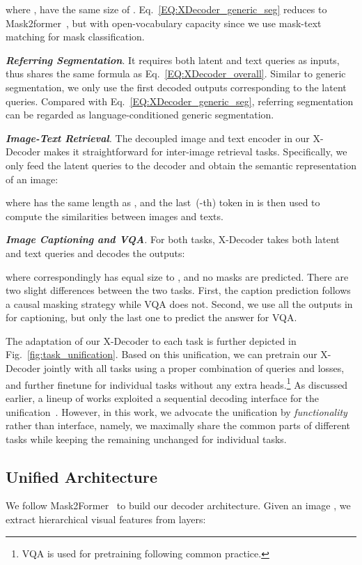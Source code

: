 \documentclass[10pt,twocolumn,letterpaper]{article}
\newcommand{\ourmodel}{X-Decoder}
\begin{document}
    where ,  have the same size of . Eq.~\eqref{EQ:XDecoder_generic_seg} reduces to Mask2former~\cite{cheng2022masked}, but with open-vocabulary capacity since we use mask-text matching for mask classification. 
    
     \textit{\textbf{Referring Segmentation}}. It requires both latent and text queries as inputs, thus shares the same formula as Eq.~\eqref{EQ:XDecoder_overall}. Similar to generic segmentation, we only use the first  decoded outputs corresponding to the latent queries. Compared with Eq.~\eqref{EQ:XDecoder_generic_seg}, referring segmentation can be regarded as language-conditioned generic segmentation.
    
     \textit{\textbf{Image-Text Retrieval}.}  The decoupled image and text encoder in our \ourmodel{} makes it straightforward for inter-image retrieval tasks. Specifically, we only feed the latent queries to the decoder and obtain the semantic representation of an image:
    
    where  has the same length as , and the last~(-th) token in  is then used to compute the similarities between images and texts.
    
     \textit{\textbf{Image Captioning and VQA}.} For both tasks, \ourmodel{} takes both latent and text queries and decodes the outputs:
    
    where  correspondingly has equal size to , and no masks are predicted. There are two slight differences between the two tasks. First, the caption prediction follows a causal masking strategy while VQA does not. Second, we use all the outputs in  for captioning, but only the last one to predict the answer for VQA. 
    
The adaptation of our \ourmodel{} to each task is further depicted in Fig.~\ref{fig:task_unification}. Based on this unification, we can pretrain our \ourmodel{} jointly with all tasks using a proper combination of queries and losses, and further finetune for individual tasks without any extra heads.\footnote{VQA is used for pretraining following common practice.} As discussed earlier, a lineup of works exploited a sequential decoding interface for the unification~\cite{cho2021unifying,wang2022unifying,chen2022unified,chen2022unified,yang2022unitab,lu2022unified}. 
However, in this work, {we advocate the unification by \emph{functionality} rather than interface}, namely, we maximally share the common parts of different tasks while keeping the remaining unchanged for individual tasks. 

\subsection{Unified Architecture}
We follow Mask2Former~\cite{cheng2022masked} to build our decoder architecture. Given an image , we extract hierarchical visual features from  layers:
\end{document}
